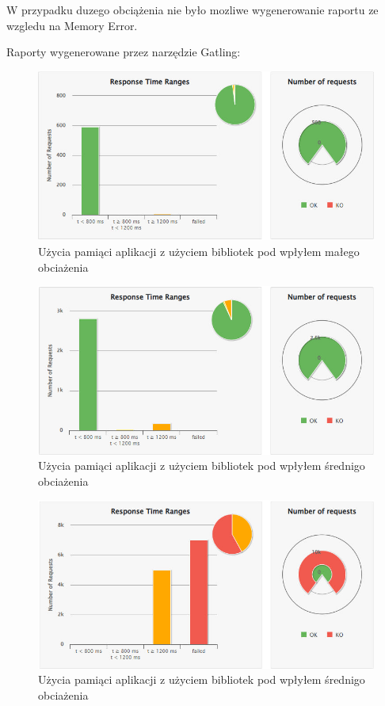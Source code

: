 \documentclass[runningheads,12pt]{llncs}
\begin{document}
W przypadku duzego obciążenia nie było mozliwe wygenerowanie raportu ze wzgledu na Memory Error.


Raporty wygenerowane przez narzędzie Gatling:

\begin{figure}
    \includegraphics[width=\linewidth]{images/sdk-gatling-low-graph.jpg}
    \caption{Użycia pamiąci aplikacji z użyciem bibliotek pod wpłyłem małego obciażenia} \label{fig1}
\end{figure}

\begin{figure}
    \includegraphics[width=\linewidth]{images/sdk-gatling-middle-graph.jpg}
    \caption{Użycia pamiąci aplikacji z użyciem bibliotek pod wpłyłem średnigo obciażenia} \label{fig1}
\end{figure}

\begin{figure}
    \includegraphics[width=\linewidth]{images/sdk-gatling-high-graph.jpg}
    \caption{Użycia pamiąci aplikacji z użyciem bibliotek pod wpłyłem średnigo obciażenia} \label{fig1}
\end{figure}
\end{document}
